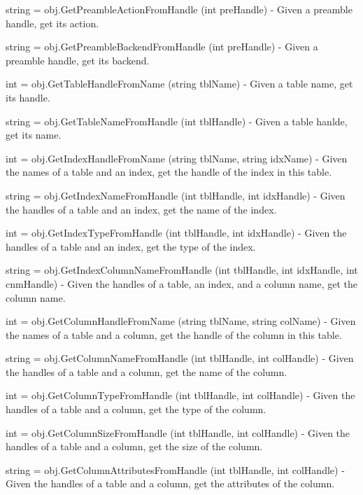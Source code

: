 \begin{DoxyItemize}
\item {\ttfamily string = obj.\-Get\-Preamble\-Action\-From\-Handle (int pre\-Handle)} -\/ Given a preamble handle, get its action.  
\item {\ttfamily string = obj.\-Get\-Preamble\-Backend\-From\-Handle (int pre\-Handle)} -\/ Given a preamble handle, get its backend.  
\item {\ttfamily int = obj.\-Get\-Table\-Handle\-From\-Name (string tbl\-Name)} -\/ Given a table name, get its handle.  
\item {\ttfamily string = obj.\-Get\-Table\-Name\-From\-Handle (int tbl\-Handle)} -\/ Given a table hanlde, get its name.  
\item {\ttfamily int = obj.\-Get\-Index\-Handle\-From\-Name (string tbl\-Name, string idx\-Name)} -\/ Given the names of a table and an index, get the handle of the index in this table.  
\item {\ttfamily string = obj.\-Get\-Index\-Name\-From\-Handle (int tbl\-Handle, int idx\-Handle)} -\/ Given the handles of a table and an index, get the name of the index.  
\item {\ttfamily int = obj.\-Get\-Index\-Type\-From\-Handle (int tbl\-Handle, int idx\-Handle)} -\/ Given the handles of a table and an index, get the type of the index.  
\item {\ttfamily string = obj.\-Get\-Index\-Column\-Name\-From\-Handle (int tbl\-Handle, int idx\-Handle, int cnm\-Handle)} -\/ Given the handles of a table, an index, and a column name, get the column name.  
\item {\ttfamily int = obj.\-Get\-Column\-Handle\-From\-Name (string tbl\-Name, string col\-Name)} -\/ Given the names of a table and a column, get the handle of the column in this table.  
\item {\ttfamily string = obj.\-Get\-Column\-Name\-From\-Handle (int tbl\-Handle, int col\-Handle)} -\/ Given the handles of a table and a column, get the name of the column.  
\item {\ttfamily int = obj.\-Get\-Column\-Type\-From\-Handle (int tbl\-Handle, int col\-Handle)} -\/ Given the handles of a table and a column, get the type of the column.  
\item {\ttfamily int = obj.\-Get\-Column\-Size\-From\-Handle (int tbl\-Handle, int col\-Handle)} -\/ Given the handles of a table and a column, get the size of the column.  
\item {\ttfamily string = obj.\-Get\-Column\-Attributes\-From\-Handle (int tbl\-Handle, int col\-Handle)} -\/ Given the handles of a table and a column, get the attributes of the column.  

\end{DoxyItemize}
